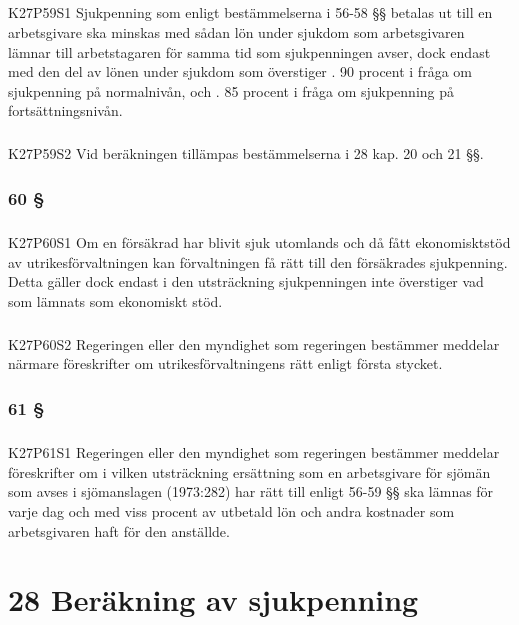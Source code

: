 \documentclass[a4paper,notitlepage,openany,10pt]{book}
\begin{document}
\paragraph*{}
{\tiny K27P59S1}
Sjukpenning som enligt bestämmelserna i 56-58 §§ betalas ut till en arbetsgivare ska minskas med sådan lön under sjukdom som arbetsgivaren lämnar till arbetstagaren för samma tid som sjukpenningen avser, dock endast med den del av lönen under sjukdom som överstiger
. 90 procent i fråga om sjukpenning på normalnivån, och
. 85 procent i fråga om sjukpenning på fortsättningsnivån.
\paragraph*{}
{\tiny K27P59S2}
Vid beräkningen tillämpas bestämmelserna i 28 kap. 20 och 21 §§.
\subsection*{60 §}
\paragraph*{}
{\tiny K27P60S1}
Om en försäkrad har blivit sjuk utomlands och då fått ekonomisktstöd av utrikesförvaltningen kan förvaltningen få rätt till den försäkrades sjukpenning. Detta gäller dock endast i den utsträckning sjukpenningen inte överstiger vad som lämnats som ekonomiskt stöd.
\paragraph*{}
{\tiny K27P60S2}
Regeringen eller den myndighet som regeringen bestämmer meddelar närmare föreskrifter om utrikesförvaltningens rätt enligt första stycket.
\subsection*{61 §}
\paragraph*{}
{\tiny K27P61S1}
Regeringen eller den myndighet som regeringen bestämmer meddelar föreskrifter om i vilken utsträckning ersättning som en arbetsgivare för sjömän som avses i sjömanslagen (1973:282) har rätt till enligt 56-59 §§ ska lämnas för varje dag och med viss procent av utbetald lön och andra kostnader som arbetsgivaren haft för den anställde.
\chapter*{28 Beräkning av sjukpenning}
\end{document}
